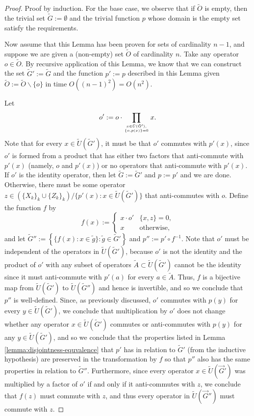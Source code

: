 \documentclass[12pt]{amsbook}
\theoremstyle{plain}
\theoremstyle{definition}
\theoremstyle{remark}
\newcommand{\lst}{\vec}
\newcommand{\set}{\tilde}
\newcommand{\paren}[1]{\left(#1\right)}
\begin{document}
\begin{proof}
Proof by induction.  For the base case, we observe that if $\set O$ is empty, then the trivial set $\set G:=\emptyset$ and the trivial function $p$ whose domain is the empty set satisfy the requirements.

Now assume that this Lemma has been proven for sets of cardinality $n-1$, and suppose we are given a (non-empty) set $\set O$ of cardinality $n$.  Take any operator $o\in\set O$.  By recursive application of this Lemma, we know that we can construct the set $\set G':=\set G$ and the function $p':=p$ described in this Lemma given $\set O:=\set O\backslash\{o\}$ in time $O\paren{(n-1)^2}=O(n^2)$.

Let $$o':=o\cdot \prod_{x\in\set U(\set G'),\atop\{o,p(x)\}=0} x.$$  Note that for every $x\in\set U(\set G')$, it must be that $o'$ commutes with $p'(x)$, since $o'$ is formed from a product that has either two factors that anti-commute with $p'(x)$ (namely, $o$ and $p'(x)$) or no operators that anti-commute with $p'(x)$.  If $o'$ is the identity operator, then let $\set G:=\set G'$ and $p:=p'$ and we are done.  Otherwise, there must be some operator $z\in\paren{\{X_k\}_k \cup \{Z_k\}_k}\slash\{p'(x):x\in\set U(\set G')\}$ that anti-commutes with $o$.  Define the function $f$ by
$$f(x) :=
\begin{cases}
x \cdot o' & \{x,z\}=0, \\
x          & \text{otherwise},
\end{cases}
$$
and let $\set G'':=\left\{\{f(x):x\in\set g\}:\set g\in\set G'\right\}$ and $p'':=p'\circ f^{-1}$.  Note that $o'$ must be independent of the operators in $\set U(\set G')$, because $o'$ is not the identity and the product of $o'$ with any subset of operators $\set A\subset\set U(\set G')$ cannot be the identity since it must anti-commute with $p'(a)$ for every $a\in\set A$.  Thus, $f$ is a bijective map from $\set U(\set G')$ to $\set U(\set G'')$ and hence is invertible, and so we conclude that $p''$ is well-defined.  Since, as previously discussed, $o'$ commutes with $p(y)$ for every $y\in\set U(\set G')$, we conclude that multiplication by $o'$ does not change whether any operator $x\in\set U(\set G')$ commutes or anti-commutes with $p(y)$ for any $y\in\set U(\set G')$, and so we conclude that the properties listed in Lemma \ref{lemma:disjointness-equvalence} that $p'$ has in relation to $\set G'$ (from the inductive hypothesis) are preserved in the transformation by $f$ so that $p''$ also has the same properties in relation to $\set G''$.  Furthermore, since every operator $x\in\set U(\lst G')$ was multiplied by a factor of $o'$ if and only if it anti-commutes with $z$, we conclude that $f(z)$ must commute with $z$, and thus every operator in $\set U(\lst G'')$ must commute with $z$.


\end{proof}
\end{document}
